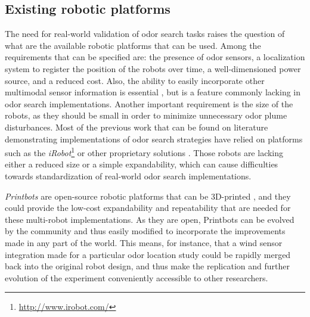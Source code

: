 


\vspace{-0.5cm}
\subsection{Existing robotic platforms}

The need for real-world validation of odor search tasks raises the question of what are the available robotic platforms that can be used.
Among the requirements that can be specified are: the presence of odor sensors, a localization system to register the position of the robots over time, a well-dimensioned power source, and a reduced cost. Also, the ability to easily incorporate other multimodal sensor information is essential \cite{Hayes02distributedodor}, but is a feature commonly lacking in odor search implementations.
Another important requirement is the size of the robots, as they should be small in order to minimize unnecessary odor plume disturbances.
Most of the previous work that can be found on literature demonstrating implementations of odor search strategies have relied on platforms such as the \emph{iRobot}\footnote{\url{http://www.irobot.com/}} \cite{Marjovi2013, marjovi2010olfactory} or other proprietary solutions \cite{ElfwingDoya14, jatmiko2011robots, KonoligeOrtiz04, HayesMG03}. Those robots are lacking either a reduced size or a simple expandability, which can cause difficulties towards standardization of real-world odor search implementations.


\emph{Printbots} are open-source robotic platforms that can be 3D-printed \cite{GonzalezValero11miniskybot,ValeroGonzalez12creativity,Garcia-Saura2012,ValeroGonzalezOOML12}, and they could provide the low-cost expandability and repeatability that are needed for these multi-robot implementations. As they are open, Printbots can be evolved by the community and thus easily modified to incorporate the improvements made in any part of the world. This means, for instance, that a wind sensor integration made for a particular odor location study could be rapidly merged back into the original robot design, and thus make the replication and further evolution of the experiment conveniently accessible to other researchers.

